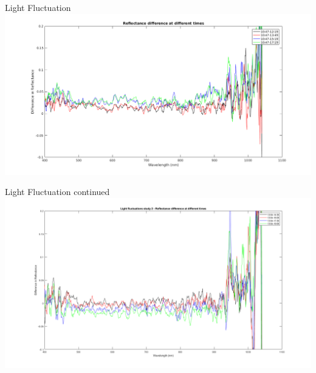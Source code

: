 \documentclass[10pt]{beamer}
\begin{document}
\begin{frame}{Light Fluctuation}
\centering
\includegraphics[width=\textwidth]{refldiffday.png}
\end{frame}
\begin{frame}{Light Fluctuation continued}
\includegraphics[width=\textwidth]{lightstudy2.png}
\end{frame}
\end{document}
